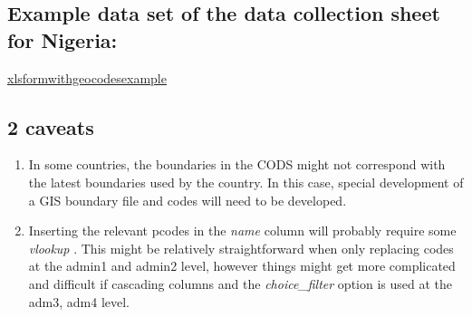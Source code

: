\documentclass[
]{article}
\begin{document}
\hypertarget{example-data-set-of-the-data-collection-sheet-for-nigeria}{%
\subsection{Example data set of the data collection sheet for Nigeria:}\label{example-data-set-of-the-data-collection-sheet-for-nigeria}}

\href{https://www.dropbox.com/s/qt2s1rbcf1zecn2/xlsformwithgeocodesexample.xlsx?dl=0}{xlsformwithgeocodesexample}

\hypertarget{caveats}{%
\subsection{2 caveats}\label{caveats}}

\begin{enumerate}
\def\labelenumi{\arabic{enumi}.}
\item
  In some countries, the boundaries in the CODS might not correspond with the latest boundaries used by the country. In this case, special development of a GIS boundary file and codes will need to be developed.
\item
  Inserting the relevant pcodes in the \emph{name} column will probably require some \emph{vlookup} . This might be relatively straightforward when only replacing codes at the admin1 and admin2 level, however things might get more complicated and difficult if cascading columns and the \emph{choice\_filter} option is used at the adm3, adm4 level.
\end{enumerate}
\end{document}
